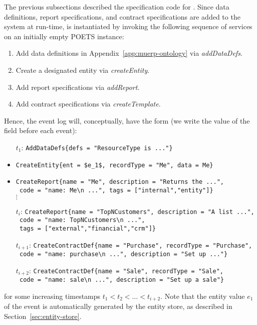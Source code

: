 The previous subsections described the specification code for
\muerp. Since data definitions, report specifications, and contract
specifications are added to the system at run-time, \muerp is
instantiated by invoking the following sequence of services on an
initially empty POETS instance:
\begin{enumerate}
\item Add data definitions in Appendix~\ref{app:muerp-ontology} via
  \emph{addDataDefs}.
\item Create a designated  entity via
  \emph{createEntity}.
\item Add report specifications via \emph{addReport}.
\item Add contract specifications via \emph{createTemplate}.
\end{enumerate}

Hence, the event log will, conceptually, have the form (we write the
value of the field  before each event):
\begin{itemize}
\item[$t_1$:] \lstinline[language=eventlog]!AddDataDefs{defs = "ResourceType is ..."}!
\item[$t_2$:] \lstinline[language=eventlog]!CreateEntity{ent = $e_1$, recordType = "Me", data = Me}!
\item[$t_3$:] \lstinline[language=eventlog]!CreateReport{name = "Me", description = "Returns the ...",!\\
\lstinline[language=eventlog]! code = "name: Me\n ...", tags = ["internal","entity"]}!\\
$\vdots$
\item[$t_i$:] \lstinline[language=eventlog]!CreateReport{name = "TopNCustomers", description = "A list ...",!\\
\lstinline[language=eventlog]! code = "name: TopNCustomers\n ...",!\\
\lstinline[language=eventlog]! tags = ["external","financial","crm"]}!
\item[$t_{i+1}$:] \lstinline[language=eventlog]!CreateContractDef{name = "Purchase", recordType = "Purchase",!\\
\lstinline[language=eventlog]! code = "name: purchase\n ...", description = "Set up ..."}!
\item[$t_{i+2}$:] \lstinline[language=eventlog]!CreateContractDef{name = "Sale", recordType = "Sale",!\\
\lstinline[language=eventlog]! code = "name: sale\n ...", description = "Set up a sale"}!
\end{itemize}
for some increasing timestamps $t_1 < t_2 < \ldots < t_{i+2}$. Note
that the entity value $e_1$ of the  event is
automatically generated by the entity store, as described in
Section~\ref{sec:entity-store}.

